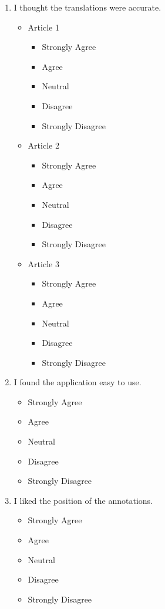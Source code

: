 \begin{enumerate}
	\item I thought the translations were accurate.
		\begin{itemize}
			\item Article 1
			\begin{itemize}
				\item Strongly Agree
				\item Agree
				\item Neutral
				\item Disagree
				\item Strongly Disagree
			\end{itemize}
			
			\item Article 2
			\begin{itemize}
				\item Strongly Agree
				\item Agree
				\item Neutral
				\item Disagree
				\item Strongly Disagree
			\end{itemize}
			
			\item Article 3
			\begin{itemize}
				\item Strongly Agree
				\item Agree
				\item Neutral
				\item Disagree
				\item Strongly Disagree
			\end{itemize}
		\end{itemize}

	\item I found the application easy to use.
		\begin{itemize}
			\item Strongly Agree
			\item Agree
			\item Neutral
			\item Disagree
			\item Strongly Disagree
		\end{itemize}
		
	\item I liked the position of the annotations.
		\begin{itemize}
			\item Strongly Agree
			\item Agree
			\item Neutral
			\item Disagree
			\item Strongly Disagree
		\end{itemize}
		

\end{enumerate}
